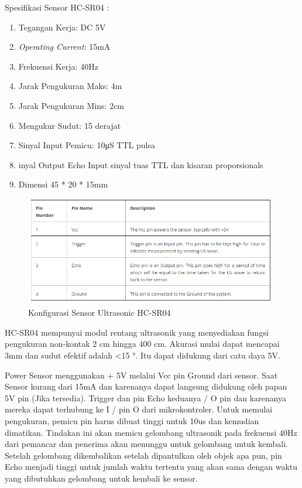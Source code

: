 \begin{enumerate}
\par Spesifikasi Sensor HC-SR04 :\\
\begin{enumerate}
    \item Tegangan Kerja: DC 5V
    \item \textit{Operating Current}: 15mA
    \item Frekuensi Kerja: 40Hz
    \item Jarak Pengukuran Maks: 4m
    \item Jarak Pengukuran Mins: 2cm
    \item Mengukur Sudut: 15 derajat
    \item Sinyal Input Pemicu: 10μS TTL pulsa
    \item inyal Output Echo Input sinyal tuas TTL dan kisaran proporsionals
    \item Dimensi 45 * 20 * 15mm
\end{enumerate}

\begin{figure}[H]
\centering
\includegraphics[width=1\textwidth]{figures/konfig.png}
\caption{Konfigurasi Sensor Ultrasonic HC-SR04}
\label{print}
\end{figure}

\par HC-SR04 mempunyai  modul rentang ultrasonik yang menyediakan fungsi pengukuran non-kontak 2 cm hingga 400 cm. Akurasi mulai dapat mencapai 3mm dan sudut efektif adalah <15 °. Itu dapat didukung dari catu daya 5V.

\par Power Sensor menggunakan + 5V melalui Vcc pin Ground dari sensor. Saat Sensor kurang dari 15mA dan karenanya dapat langsung didukung oleh papan 5V pin (Jika tersedia). Trigger dan pin Echo keduanya / O pin dan karenanya mereka dapat terhubung ke I / pin O dari mikrokontroler. Untuk memulai pengukuran, pemicu pin harus dibuat tinggi untuk 10us dan kemudian dimatikan. Tindakan ini akan memicu gelombang ultrasonik pada frekuensi 40Hz dari pemancar dan penerima akan menunggu untuk gelombang untuk kembali. Setelah gelombang dikembalikan setelah dipantulkan oleh objek apa pun, pin Echo menjadi tinggi untuk jumlah waktu tertentu yang akan sama dengan waktu yang dibutuhkan gelombang untuk kembali ke sensor.



\end{enumerate}
